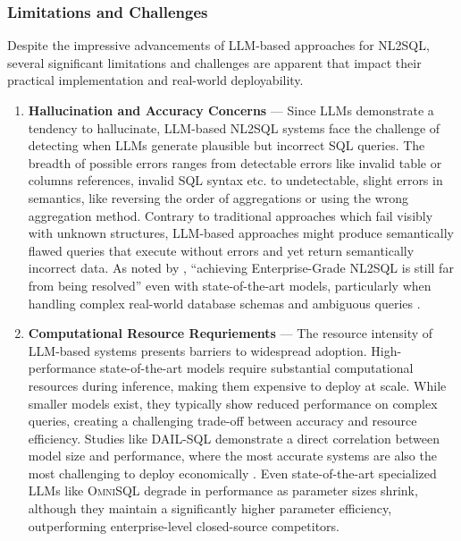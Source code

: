 \documentclass{article}
\begin{document}
\subsubsection{Limitations and Challenges}

Despite the impressive advancements of LLM-based approaches for NL2SQL, several significant limitations and challenges
are apparent that impact their practical implementation and real-world deployability.

\begin{enumerate}
    \item \textbf{Hallucination and Accuracy Concerns} — Since LLMs demonstrate a tendency to hallucinate, LLM-based
           NL2SQL systems face the challenge of detecting when LLMs generate plausible but incorrect SQL queries.
           The breadth of possible errors ranges from detectable errors like invalid table or columns references,
           invalid SQL syntax etc. to undetectable, slight errors in semantics, like reversing the order of
           aggregations or using the wrong aggregation method. Contrary to traditional approaches which fail visibly with
           unknown structures, LLM-based approaches might produce semantically flawed queries that execute without
           errors and yet return semantically incorrect data. As noted by \citeauthor{NL2SQLUnsolved}, ``achieving
           Enterprise-Grade NL2SQL is still far from being resolved'' even with state-of-the-art models, particularly
           when handling complex real-world database schemas and ambiguous queries \citep{NL2SQLUnsolved, Spider2}.
    \item \textbf{Computational Resource Requriements} — The resource intensity of LLM-based systems presents barriers
           to widespread adoption. High-performance state-of-the-art models require substantial computational resources
           during inference, making them expensive to deploy at scale. While smaller models exist, they typically show
           reduced performance on complex queries, creating a challenging trade-off between accuracy and resource
           efficiency. Studies like DAIL-SQL demonstrate a direct correlation between model size and performance,
           where the most accurate systems are also the most challenging to deploy economically \citep{DAIL-SQL}.
           Even state-of-the-art specialized LLMs like \textsc{OmniSQL} degrade in performance as parameter sizes
           shrink, although they maintain a significantly higher parameter efficiency, outperforming enterprise-level
           closed-source competitors. 

\end{enumerate}
\end{document}
